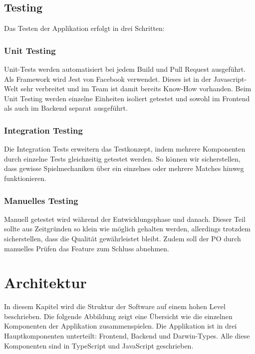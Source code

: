 \documentclass[11pt,a4paper,german]{scrartcl}
\let\oldsection\section
\renewcommand\section{\clearpage\oldsection}
\begin{document}
\subsection{Testing}
Das Testen der Applikation erfolgt in drei Schritten:

\subsubsection{Unit Testing}
Unit-Tests werden automatisiert bei jedem Build und Pull Request ausgeführt.
Als Framework wird Jest von Facebook verwendet. Dieses ist in der Javascript-Welt sehr verbreitet und im Team ist damit bereits Know-How vorhanden.
Beim Unit Testing werden einzelne Einheiten isoliert getestet und sowohl im Frontend als auch im Backend separat ausgeführt.

\subsubsection{Integration Testing}
Die Integration Tests erweitern das Testkonzept, indem mehrere Komponenten durch einzelne Tests gleichzeitig getestet werden. So können wir sicherstellen, dass gewisse Spielmechaniken über ein einzelnes oder mehrere Matches hinweg funktionieren.

\subsubsection{Manuelles Testing}
Manuell getestet wird während der Entwicklungsphase und danach. Dieser Teil sollte aus Zeitgründen so klein wie möglich gehalten werden, allerdings trotzdem sicherstellen, dass die Qualität gewährleistet bleibt. 
Zudem soll der PO durch manuelles Prüfen das Feature zum Schluss abnehmen.


\section{Architektur}
In diesem Kapitel wird die Struktur der Software auf einem hohen Level beschrieben. Die folgende Abbildung zeigt eine Übersicht wie die einzelnen Komponenten der Applikation zusammenspielen.
Die Applikation ist in drei Hauptkomponenten unterteilt: Frontend, Backend und Darwin-Types. Alle diese Komponenten sind in TypeScript und JavaScript geschrieben. 
\end{document}

